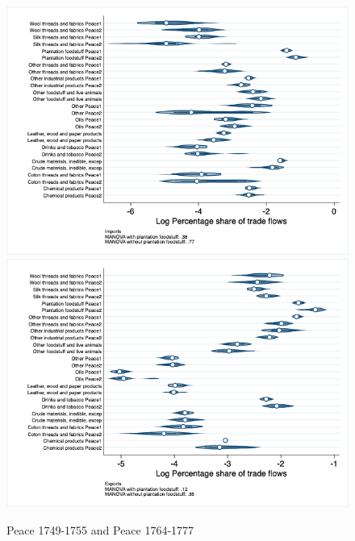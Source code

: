\documentclass[12pt,a4paper,notitlepage,english]{article}
\begin{document}
\begin{figure}
\centering
\caption{Peace 1749-1755 and Peace 1764-1777}
\label{seven_peace1764_1777_nat_distr}
\includegraphics[scale=.4]{peace1749_1755_peace1764_1777_nat_distr_I}
\includegraphics[scale=.4]{peace1749_1755_peace1764_1777_nat_distr_X}
\end{figure}
\end{document}
